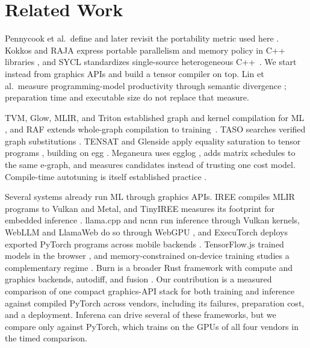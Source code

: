 \documentclass[conference]{IEEEtran}
\newcommand{\system}{Meganeura}
\newcommand{\inferena}{Inferena}
\begin{document}
\section{Related Work}

Pennycook et al.\ define and later revisit the portability metric used here
\cite{pennycook2016metric,pennycook2021revisiting}. Kokkos and RAJA express
portable parallelism and memory policy in C++ libraries
\cite{edwards2014kokkos,beckingsale2019raja}, and SYCL standardizes
single-source heterogeneous C++~\cite{khronos2020sycl}. We start instead from
graphics APIs and build a tensor compiler on top. Lin et al.\ measure
programming-model productivity through semantic divergence
\cite{lin2024productivity}; preparation time and executable size do not
replace that measure.

TVM, Glow, MLIR, and Triton established graph and kernel compilation for ML
\cite{chen2018tvm,rotem2018glow,lattner2021mlir,tillet2019triton}, and RAF
extends whole-graph compilation to training~\cite{yu2023raf}. TASO searches
verified graph substitutions \cite{jia2019taso}. TENSAT and Glenside apply
equality saturation to tensor programs
\cite{yang2021tensat,smith2021glenside}, building on egg
\cite{willsey2021egg}. \system{} uses egglog \cite{zhang2023egglog}, adds
matrix schedules to the same e-graph, and measures candidates instead of
trusting one cost model. Compile-time autotuning is itself established
practice \cite{chen2018tvm,tillet2019triton}.

Several systems already run ML through graphics APIs. IREE compiles MLIR
programs to Vulkan and Metal, and TinyIREE measures its footprint for
embedded inference \cite{liu2022tinyiree}. llama.cpp \cite{ggml2026llamacpp}
and ncnn \cite{tencent2026ncnn} run inference through Vulkan kernels, WebLLM
and LlamaWeb do so through WebGPU \cite{ruan2024webllm,levine2026llamaweb},
and ExecuTorch deploys exported PyTorch programs across mobile backends
\cite{nachin2026executorch}. TensorFlow.js trained models in the browser
\cite{smilkov2019tensorflowjs}, and memory-constrained on-device training
studies a complementary regime \cite{lin2022ondevice}. Burn is a broader Rust
framework with compute and graphics backends, autodiff, and fusion
\cite{simard2026burn}. Our contribution is a measured comparison of one
compact graphics-API stack for both training and inference against compiled
PyTorch across vendors, including its failures, preparation cost, and a
deployment. \inferena{} can drive several of these frameworks, but we compare
only against PyTorch, which trains on the GPUs of all four vendors in the
timed comparison.
\end{document}
